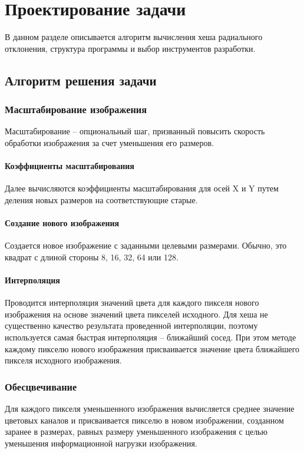 \chapter{Проектирование задачи}

В данном разделе описывается алгоритм вычисления хеша радиального отклонения,
структура программы и выбор инструментов разработки.

\section{Алгоритм решения задачи}

\subsection{Масштабирование изображения}
Масштабирование -- опциональный шаг, призванный повысить скорость обработки
изображения за счет уменьшения его размеров.

\subsubsection{Коэффициенты масштабирования}
Далее вычисляются коэффициенты масштабирования для осей X и Y путем деления
новых размеров на соответствующие старые.

\subsubsection{Создание нового изображения}
Создается новое изображение с заданными целевыми размерами. Обычно, это квадрат
с длиной стороны 8, 16, 32, 64 или 128.

\subsubsection{Интерполяция}
Проводится интерполяция значений цвета для каждого пикселя нового изображения на
основе значений цвета пикселей исходного. Для хеша не существенно качество
результата проведенной интерполяции, поэтому используется самая быстрая
интерполяция -- ближайший сосед. При этом методе каждому пикселю нового
изображения присваивается значение цвета ближайшего пикселя исходного
изображения.

\subsection{Обесцвечивание}
Для каждого пикселя уменьшенного изображения вычисляется среднее значение
цветовых каналов и присваивается пикселю в новом изображении, созданном заранее
в размерах, равных размеру уменьшенного изображения с целью уменьшения
информационной нагрузки изображения.


